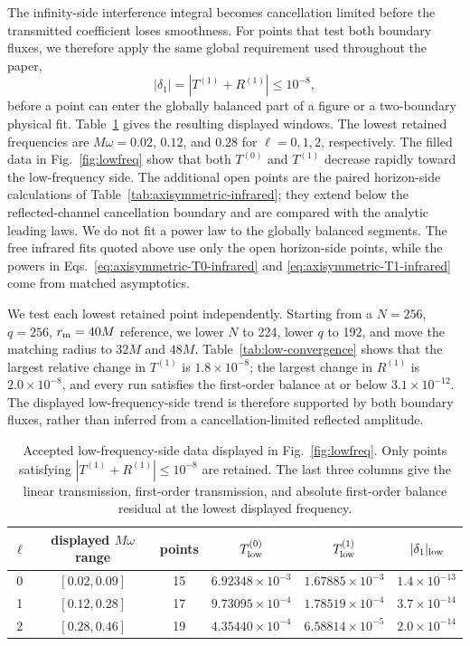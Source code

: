 \documentclass[aps,prd,twocolumn,10pt,nofootinbib,superscriptaddress,floatfix]{revtex4-2}
\begin{document}
The infinity-side interference integral becomes cancellation limited before
the transmitted coefficient loses smoothness.  For points that test both
boundary fluxes, we therefore apply the same global requirement used
throughout the paper,
\begin{equation}
|\delta_1|=|T^{(1)}+R^{(1)}|\leq10^{-8},
\end{equation}
before a point can enter the globally balanced part of a figure or a
two-boundary physical fit.  Table~\ref{tab:low-acceptance} gives the resulting
displayed windows.  The lowest retained frequencies are
$M\omega=0.02$, $0.12$, and $0.28$ for $\ell=0,1,2$, respectively.  The
filled data in Fig.~\ref{fig:lowfreq} show that both $T^{(0)}$ and
$T^{(1)}$ decrease rapidly toward the low-frequency side.  The additional
open points are the paired horizon-side calculations of
Table~\ref{tab:axisymmetric-infrared}; they extend below the reflected-channel
cancellation boundary and are compared with the analytic leading laws.  We
do not fit a power law to the globally balanced segments.  The free infrared
fits quoted above use only the open horizon-side points, while the powers in
Eqs.~\eqref{eq:axisymmetric-T0-infrared} and
\eqref{eq:axisymmetric-T1-infrared} come from matched asymptotics.

We test each lowest retained point independently.  Starting from a
$N=256$, $q=256$, $r_{\rm m}=40M$ reference, we lower $N$ to 224, lower $q$ to
192, and move the matching radius to $32M$ and $48M$.  Table~\ref{tab:low-convergence}
shows that the largest relative change in $T^{(1)}$ is $1.8\times10^{-8}$;
the largest change in $R^{(1)}$ is $2.0\times10^{-8}$, and every run satisfies
the first-order balance at or below $3.1\times10^{-12}$.  The displayed
low-frequency-side trend is therefore supported by both boundary fluxes,
rather than inferred from a cancellation-limited reflected amplitude.

\begin{table}[t]
\caption{Accepted low-frequency-side data displayed in
Fig.~\ref{fig:lowfreq}.  Only points satisfying
$|T^{(1)}+R^{(1)}|\leq10^{-8}$ are retained.  The last three columns give the
linear transmission, first-order transmission, and absolute first-order
balance residual at the lowest displayed frequency.}
\label{tab:low-acceptance}
\begin{ruledtabular}
\begin{tabular}{c c c c c c}
$\ell$ & displayed $M\omega$ range & points
& $T^{(0)}_{\rm low}$ & $T^{(1)}_{\rm low}$ & $|\delta_1|_{\rm low}$\\
\hline
0 & $[0.02,0.09]$ & 15 & $6.92348\times10^{-3}$ & $1.67885\times10^{-3}$ & $1.4\times10^{-13}$\\
1 & $[0.12,0.28]$ & 17 & $9.73095\times10^{-4}$ & $1.78519\times10^{-4}$ & $3.7\times10^{-14}$\\
2 & $[0.28,0.46]$ & 19 & $4.35440\times10^{-4}$ & $6.58814\times10^{-5}$ & $2.0\times10^{-14}$\\
\end{tabular}
\end{ruledtabular}
\end{table}
\end{document}
